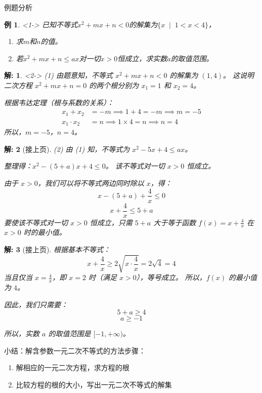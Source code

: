 \documentclass[aspectratio=169,13pt,fleqn,t] {beamer}
\newtheorem*{solve}{解:}
\newtheorem{instance}{例}   %
\begin{document}
\begin{frame}{例题分析}
	\vspace{-1.5em}
	\begin{instance}<1->
		已知不等式$x^2 + mx + n < 0$的解集为$\{x \;\mid \;1 < x < 4\}$，
		\begin{enumerate}[(1)]
			\item 求$m$和$n$的值。
			\item 若$x^2 + mx + n \leqslant ax$对一切$x > 0$恒成立，求实数$a$的取值范围。
		\end{enumerate}
	\end{instance}
	\vspace{-1em}
	\begin{solve}<2->		
(1)	由题意知，不等式 \(x^2 + mx + n < 0\) 的解集为 \((1, 4)\)。
	这说明二次方程 \(x^2 + mx + n = 0\) 的两个根分别为 \(x_1 = 1\) 和 \(x_2 = 4\)。
	
	根据韦达定理（根与系数的关系）：
	\begin{align*}
		x_1 + x_2 &= -m \implies 1 + 4 = -m \implies m = -5 \\
		x_1 \cdot x_2 &= n \implies 1 \times 4 = n \implies n = 4
	\end{align*}
	所以，\(m = -5\)，\(n = 4\)。
	\end{solve}
\end{frame}

\begin{frame}{}
	\begin{solve}[接上页]
(2)		由 (1) 知，不等式为 \(x^2 - 5x + 4 \le ax\)。

		整理得：\(x^2 - (5+a)x + 4 \le 0\)。
		该不等式对一切 \(x > 0\) 恒成立。
		
		由于 \(x > 0\)，我们可以将不等式两边同时除以 \(x\)，得：
		\[
		x - (5+a) + \frac{4}{x} \le 0
		\]
		\[
		x + \frac{4}{x} \le 5 + a
		\]
		要使该不等式对一切 \(x > 0\) 恒成立，只需 \(5+a\) 大于等于函数 \(f(x) = x + \frac{4}{x}\) 在 \(x > 0\) 时的最小值。
		
	\end{solve}
\end{frame}
\begin{frame}
	\begin{solve}[接上页]
		根据基本不等式：
		\[
		x + \frac{4}{x} \ge 2\sqrt{x \cdot \frac{4}{x}} = 2\sqrt{4} = 4
		\]
		当且仅当 \(x = \frac{4}{x}\)，即 \(x = 2\) 时（满足 \(x>0\)），等号成立。
		所以，\(f(x)\) 的最小值为 \(4\)。
		
		因此，我们只需要：
		\[
		5 + a \ge 4
		\]
		\[
		a \ge -1
		\]
		
		所以，实数 \(a\) 的取值范围是 \([-1, +\infty)\)。
	\end{solve}
\end{frame}



\begin{frame}[t]{小结：解含参数一元二次不等式的方法步骤：}
	\begin{enumerate}
		\item 解相应的一元二次方程，求方程的根
		\item 比较方程的根的大小，写出一元二次不等式的解集
	\end{enumerate}

\end{frame}
\end{document}
